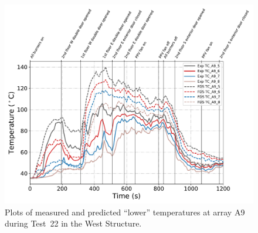 \begin{figure}[!h]
	\centering
	\includegraphics[width=\columnwidth]{Figures/Plots/Validation/Temperature/Test_22_TC_A9_lower}
	\caption{Plots of measured and predicted ``lower'' temperatures at array A9 during Test~22 in the West Structure.}
	\label{fig:TCA9_lower_data_Test22}
\end{figure}

